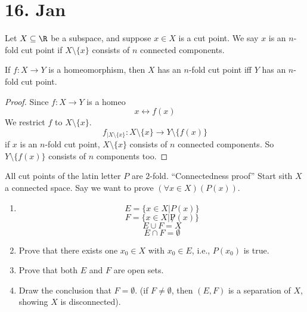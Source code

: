 \section{16. Jan}
\begin{definition}
  Let $X\subseteq \R$ be a subspace, and suppose $x\in X$ is a cut point. We say $x$ is an $n$-fold cut point if $X\setminus \{x\}$ consists of $n$ connected components.
\end{definition}

\begin{proposition}
  If $f:X\to Y$ is a homeomorphism, then $X$ has an $n$-fold cut point iff $Y$ has an $n$-fold cut point.
\end{proposition}
\begin{proof}
  Since $f:X\to Y$ is a homeo
    $$x\leftrightarrow f(x)$$
  We restrict $f$ to $X\setminus \{x\}$.
    $$f_{\rvert X\setminus\{x\}}: X\setminus\{x\} \to Y\setminus\{f(x)\}$$
  if $x$ is an $n$-fold cut point, $X\setminus\{x\}$ consists of $n$ connected components. So $Y\setminus\{f(x)\}$ consists of $n$ components too.
  \qedhere
\end{proof}

All cut points of the latin letter $P$ are $2$-fold.
``Connectedness proof''
\newline
Start sith $X$ a connected space. Say we want to prove $\left(\forall x\in X\right)\left(P(x)\right)$.
  \begin{enumerate}[(1)]
    \item
      $$E=\{x\in X | P(x)\}$$
      $$F=\{x\in X |\not P(x)\}$$
      $$E \cup F = X$$
      $$E \cap F = \emptyset$$
    \item
      Prove that there exists one $x_0\in X$ with $x_0\in E$, i.e., $P(x_0)$ is true.
    \item
      Prove that both $E$ and $F$ are open sets.
    \item Draw the conclusion that $F=\emptyset$. (if $F\neq \emptyset $, then $(E,F)$ is a separation of $X$, showing $X$ is disconnected).
  \end{enumerate}
